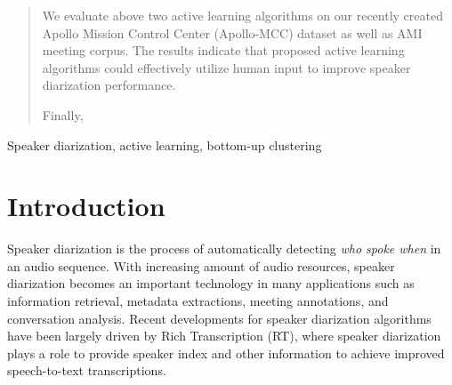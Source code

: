 \documentclass[journal]{IEEEtran}
\begin{document}
\begin{abstract}
We evaluate above two active learning algorithms on our recently created Apollo Mission Control Center (Apollo-MCC) dataset as well as AMI meeting corpus. The results indicate that proposed active learning algorithms could effectively utilize human input to improve speaker diarization performance.

Finally, 
     
\end{abstract}

\begin{IEEEkeywords}
Speaker diarization, active learning, bottom-up clustering
\end{IEEEkeywords}

%
\IEEEpeerreviewmaketitle

\section{Introduction}
\label{intro}
Speaker diarization is the process of automatically detecting \textit{who spoke when }in an audio sequence. With increasing amount of audio resources, speaker diarization becomes an important technology in many applications such as information retrieval, metadata extractions, meeting annotations, and conversation analysis. Recent developments for speaker diarization algorithms have been largely driven by Rich Transcription (RT), where speaker diarization plays a role to provide speaker index and other information to achieve improved speech-to-text transcriptions.
\end{document}
